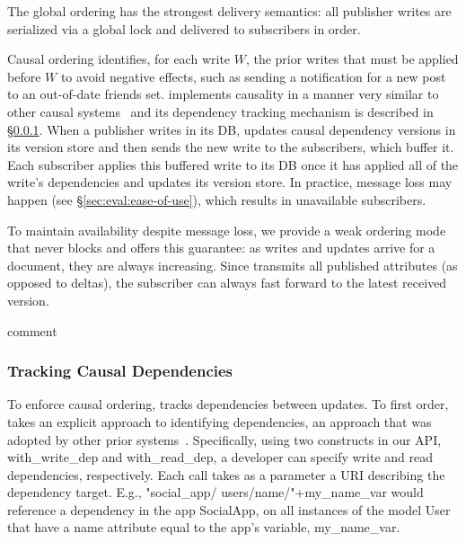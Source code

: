The global ordering has the strongest delivery semantics: all publisher writes are serialized via a global lock and delivered to subscribers in order.

Causal ordering identifies, for each write $W$, the prior writes that must
be applied before $W$ to avoid negative effects, such as sending a notification
for a new post to an out-of-date friends set.
\synapse implements causality in a manner very similar to other
causal systems~\cite{ahamad1995causal,Birman:1991:LCA:128738.128742,eiger,bolton}
and its dependency tracking mechanism is described in \S\ref{sec:arch:deps}.
When a publisher writes in its DB, \synapse updates causal dependency versions in its
version store and then sends the new write to the subscribers, which buffer it.
Each subscriber applies this buffered write to its DB once it has applied all
of the write's dependencies and updates its version store.
In practice, message loss may happen (see \S\ref{sec:eval:ease-of-use}), which
results in unavailable subscribers.

To maintain availability despite message loss, we provide a weak
ordering mode that never blocks and offers this guarantee: as writes and
updates arrive for a document, they are always increasing.
Since \synapse transmits all published attributes (as opposed to deltas), the subscriber can always fast forward to the latest received version.

   comment

\subsubsection{Tracking Causal Dependencies} \label{sec:arch:deps}

To enforce causal ordering, \synapse tracks dependencies between updates.  To
first order, \synapse takes an explicit approach to identifying
dependencies, an approach that was adopted by other prior
systems~\cite{bolton,cops,Bailis:2012:PDC:2391229.2391251}.
Specifically, using two constructs in
our API, {\code with\_write\_dep} and {\code with\_read\_dep}, a developer
can specify write and read dependencies, respectively.  Each call takes as a
parameter a URI describing the dependency target. E.g.,
{\code"social\_app/ users/name/"+my\_name\_var} would reference a dependency in
the app {\code SocialApp}, on all instances of the model {\code User} that have
a {\code name} attribute equal to the app's variable, {\code my\_name\_var}.

